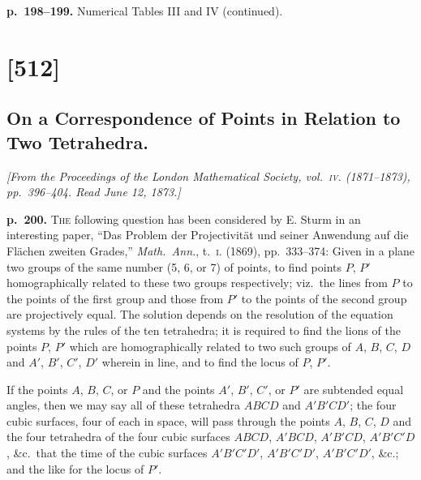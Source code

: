 \documentclass[11pt,a4paper]{book}
\begin{document}
\clearpage

\noindent
\textbf{p.~198--199.}  Numerical Tables III and IV (continued).


\clearpage

\section{[512]}
\subsection{On a Correspondence of Points in Relation to Two Tetrahedra.}

\begin{center}
\textit{[From the Proceedings of the London Mathematical Society, vol.\ \textsc{iv}. (1871--1873),
pp.\ 396--404.  Read June 12, 1873.]}
\end{center}

\noindent
\textbf{p.~200.}  \textsc{The} following question has been considered by E. Sturm in an interesting paper,
``Das Problem der Projectivit\"at und seiner Anwendung auf die Fl\"achen zweiten
Grades,'' \textit{Math.\ Ann.}, t.\ \textsc{i.} (1869), pp.\ 333--374:  Given in a plane two groups of the
same number (5, 6, or 7) of points, to find points $P$, $P'$ homographically related to
these two groups respectively; viz.\ the lines from $P$ to the points of the first group
and those from $P'$ to the points of the second group are projectively equal.  The
solution depends on the resolution of the equation systems by the rules of the
ten tetrahedra; it is required to find the lions of the points $P$, $P'$ which are
homographically related to two such groups of $A$, $B$, $C$, $D$ and $A'$, $B'$, $C'$, $D'$ wherein
in line, and to find the locus of $P$, $P'$.

If the points $A$, $B$, $C$, or $P$ and the points $A'$, $B'$, $C'$, or $P'$ are subtended equal angles, then we may say all of these tetrahedra $ABCD$ and $A'B'CD'$; the four cubic surfaces, four of each in space, will pass through the points $A$, $B$, $C$, $D$ and the four tetrahedra of the four cubic surfaces $ABCD$, $A'BCD$, $A'B'CD$, $A'B'C'D$, \&c.\ that the time of the cubic surfaces $A'B'C'D'$, $A'B'C'D'$, $A'B'C'D'$, \&c.; and the like for the locus of $P'$.
\end{document}
